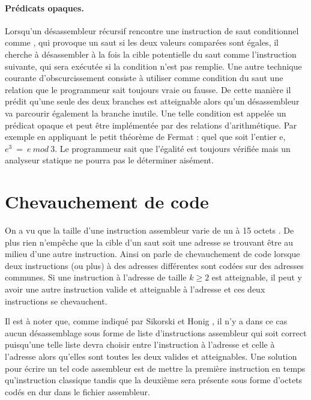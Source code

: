 \paragraph{Prédicats opaques.}
Lorsqu'un désassembleur récursif rencontre une instruction de saut conditionnel comme \je, qui provoque un saut si les deux valeurs comparées sont égales, il cherche à désassembler à la fois la cible potentielle du saut comme l'instruction suivante, qui sera exécutée si la condition n'est pas remplie.
Une autre technique courante d'obscurcissement \cite{MKK07} consiste à utiliser comme condition du saut une relation que le programmeur sait toujours vraie ou fausse. De cette manière il prédit qu'une seule des deux branches est atteignable alors qu'un désassembleur va parcourir également la branche inutile.
Une telle condition est appelée un prédicat opaque et peut être implémentée par des relations d'arithmétique. Par exemple en appliquant le petit théorème de Fermat \cite{fermat} : quel que soit l'entier e, $e^3\ =\ e\ mod\ 3$.
Le programmeur sait que l'égalité est toujours vérifiée mais un analyseur statique ne pourra pas le déterminer aisément.


\section{Chevauchement de code}
On a vu que la taille d'une instruction assembleur varie de un à 15 octets .
De plus rien n'empêche que la cible d'un saut soit une adresse se trouvant être au milieu d'une autre instruction.
Ainsi on parle de chevauchement de code lorsque deux instructions (ou plus) à des adresses différentes sont codées sur des adresses communes. Si une instruction à l'adresse  de taille $k\geq 2$ est atteignable, il peut y avoir une autre instruction valide et atteignable à l'adresse  et ces deux instructions se chevauchent.

Il est à noter que, comme indiqué par Sikorski et Honig \cite{PMA}, il n'y a dans ce cas aucun désassemblage sous forme de liste d'instructions assembleur qui soit correct puisqu'une telle liste devra choisir entre l'instruction à l'adresse  et celle à l'adresse  alors qu'elles sont toutes les deux valides et atteignables. Une solution pour écrire un tel code assembleur est de mettre la première instruction en temps qu'instruction classique tandis que la deuxième sera présente sous forme d'octets codés en dur dans le fichier assembleur.

